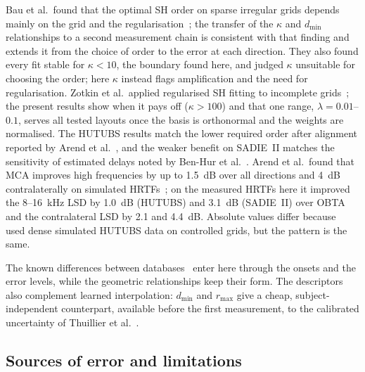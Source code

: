 \documentclass[11pt,a4paper]{article}
\newcommand{\dmin}{d_{\min}}
\newcommand{\rmax}{r_{\max}}
\begin{document}
Bau et al.\ found that the optimal SH order on sparse irregular grids depends mainly on the grid and the regularisation~\cite{bau2022}; the transfer of the $\kappa$ and $\dmin$ relationships to a second measurement chain is consistent with that finding and extends it from the choice of order to the error at each direction. They also found every fit stable for $\kappa<10$, the boundary found here, and judged $\kappa$ unsuitable for choosing the order; here $\kappa$ instead flags amplification and the need for regularisation. Zotkin et al.\ applied regularised SH fitting to incomplete grids~\cite{zotkin2009}; the present results show when it pays off ($\kappa>100$) and that one range, $\lambda=0.01$--$0.1$, serves all tested layouts once the basis is orthonormal and the weights are normalised. The HUTUBS results match the lower required order after alignment reported by Arend et al.~\cite{arend2021}, and the weaker benefit on SADIE~II matches the sensitivity of estimated delays noted by Ben-Hur et al.~\cite{benhur2019}. Arend et al.\ found that MCA improves high frequencies by up to 1.5~dB over all directions and 4~dB contralaterally on simulated HRTFs~\cite{arend2023}; on the measured HRTFs here it improved the 8--16~kHz LSD by 1.0~dB (HUTUBS) and 3.1~dB (SADIE~II) over OBTA and the contralateral LSD by 2.1 and 4.4~dB. Absolute values differ because~\cite{arend2023} used dense simulated HUTUBS data on controlled grids, but the pattern is the same.

The known differences between databases~\cite{andreopoulou2015,wen2023} enter here through the onsets and the error levels, while the geometric relationships keep their form. The descriptors also complement learned interpolation: $\dmin$ and $\rmax$ give a cheap, subject-independent counterpart, available before the first measurement, to the calibrated uncertainty of Thuillier et al.~\cite{thuillier2024}.

\subsection{Sources of error and limitations}
\end{document}

